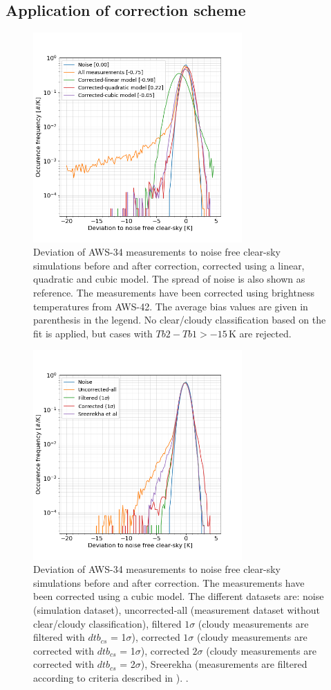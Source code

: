 \documentclass[12pt]{article}
\begin{document}
\subsection{Application of correction scheme}
%
\begin{figure}[!p]
	\centering
	\includegraphics[clip,trim=0 0 0 0,height=80mm]{PDF_corrected_AWS-34_AWS-42_allfits}
	\caption{Deviation of AWS-34 measurements to noise free clear-sky
      simulations before and after correction, corrected using a linear,
      quadratic and cubic model. The spread of noise is also shown as
      reference. The measurements have been corrected using brightness
      temperatures from AWS-42. The average bias values are given in parenthesis in the legend. No clear/cloudy classification based on the fit is applied, but cases with $Tb2 - Tb1 > -15$\,K are rejected.}
	\label{fig:correction:c34-42:fit}
\end{figure}
%
\begin{figure}[!p]
	\centering
	\includegraphics[height=80mm]{PDF_corrected_AWS-34_AWS-42_all}
	\caption{Deviation of AWS-34 measurements to noise free clear-sky simulations before and after correction. The measurements have been corrected using a cubic model. The different datasets are: noise (simulation dataset), uncorrected-all (measurement dataset without clear/cloudy classification), filtered $1\sigma$ (cloudy measurements are filtered with $dtb_{cs}$ = 1$\sigma$), corrected $1\sigma$ (cloudy measurements are corrected with $dtb_{cs}$ = 1$\sigma$), corrected $2\sigma$ (cloudy measurements are corrected with $dtb_{cs}$ = 2$\sigma$), Sreerekha (measurements are filtered according to criteria described in \cite{rekha2012potential}).
      \cite{rekha2012potential}.}
	\label{fig:correction:c34-42}
\end{figure}
\end{document}
